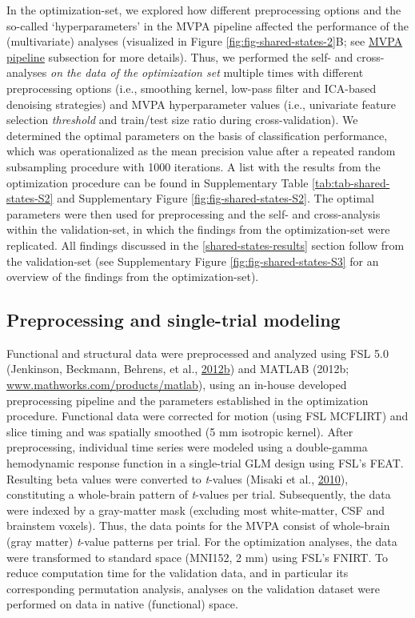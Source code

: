 \documentclass[11pt,american,]{memoir} %
\begin{document}
In the optimization-set, we explored how different preprocessing options and the so-called `hyperparameters' in the MVPA pipeline affected the performance of the (multivariate) analyses (visualized in Figure \ref{fig:fig-shared-states-2}B; see \protect\hyperlink{shared-states-methods-mvpa-pipeline}{MVPA pipeline} subsection for more details). Thus, we performed the self- and cross-analyses \emph{on the data of the optimization set} multiple times with different preprocessing options (i.e., smoothing kernel, low-pass filter and ICA-based denoising strategies) and MVPA hyperparameter values (i.e., univariate feature selection \emph{threshold} and train/test size ratio during cross-validation). We determined the optimal parameters on the basis of classification performance, which was operationalized as the mean precision value after a repeated random subsampling procedure with 1000 iterations. A list with the results from the optimization procedure can be found in Supplementary Table \ref{tab:tab-shared-states-S2} and Supplementary Figure \ref{fig:fig-shared-states-S2}. The optimal parameters were then used for preprocessing and the self- and cross-analysis within the validation-set, in which the findings from the optimization-set were replicated. All findings discussed in the \ref{shared-states-results} section follow from the validation-set (see Supplementary Figure \ref{fig:fig-shared-states-S3} for an overview of the findings from the optimization-set).

\hypertarget{shared-states-methods-preprocessing}{%
\subsection{Preprocessing and single-trial modeling}\label{shared-states-methods-preprocessing}}

Functional and structural data were preprocessed and analyzed using FSL 5.0 (Jenkinson, Beckmann, Behrens, et al., \protect\hyperlink{ref-jenkinson2012fsl}{2012}\protect\hyperlink{ref-jenkinson2012fsl}{b}) and MATLAB (2012b; \url{www.mathworks.com/products/matlab}), using an in-house developed preprocessing pipeline and the parameters established in the optimization procedure. Functional data were corrected for motion (using FSL MCFLIRT) and slice timing and was spatially smoothed (5 mm isotropic kernel). After preprocessing, individual time series were modeled using a double-gamma hemodynamic response function in a single-trial GLM design using FSL's FEAT. Resulting beta values were converted to \emph{t}-values (Misaki et al., \protect\hyperlink{ref-misaki2010comparison}{2010}), constituting a whole-brain pattern of \emph{t}-values per trial. Subsequently, the data were indexed by a gray-matter mask (excluding most white-matter, CSF and brainstem voxels). Thus, the data points for the MVPA consist of whole-brain (gray matter) \emph{t}-value patterns per trial. For the optimization analyses, the data were transformed to standard space (MNI152, 2 mm) using FSL's FNIRT. To reduce computation time for the validation data, and in particular its corresponding permutation analysis, analyses on the validation dataset were performed on data in native (functional) space.
\end{document}
